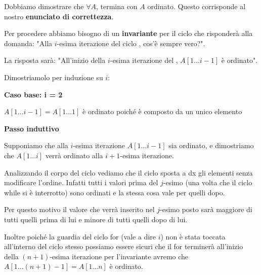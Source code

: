 \begin{flushleft}

Dobbiamo dimostrare che $\forall A$,  termina con $A$ ordinato. Questo
corrisponde al nostro \textbf{enunciato di correttezza}.

\medskip

Per procedere abbiamo bisogno di un \textbf{invariante} per il ciclo  che risponderà alla
domanda: "Alla $i$-esima iterazione del ciclo , cos'è sempre vero?".

La risposta sarà: "All'inizio della $i$-esima iterazione del , $A[1...i-1]$ è ordinato".

Dimostriamolo per induzione su $i$:

\medskip

\textbf{Caso base: i = 2}

$A[1...i-1] = A[1...1]$ è ordinato poiché è composto da un unico elemento

\medskip

\textbf{Passo induttivo}

Supponiamo che alla $i$-esima iterazione $A[1...i-1]$ sia ordinato, e dimostriamo che $A[1...i]$ verrà ordinato
alla $i+1$-esima iterazione.

Analizzando il corpo del ciclo  vediamo che il ciclo  sposta a dx gli elementi 
senza modificare l'ordine. Infatti tutti i valori prima del $j$-esimo (una volta che il ciclo while si è 
interrotto) sono ordinati e la stessa cosa vale per quelli dopo.

Per questo motivo il valore che verrà inserito nel $j$-esimo posto sarà maggiore di tutti quelli prima di lui
e minore di tutti quelli dopo di lui.

Inoltre poiché la guardia del ciclo for (vale a dire $i$) non è stata toccata all'interno del ciclo stesso
possiamo essere sicuri che il for terminerà all'inizio della $(n+1)$-esima iterazione per l'invariante avremo
che $A[1...(n+1)-1] = A[1...n]$ è ordinato.

\end{flushleft}
